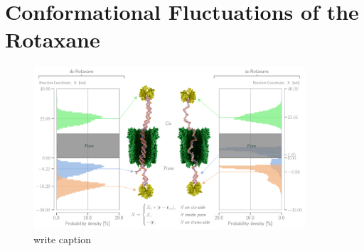 \section{Conformational Fluctuations of the Rotaxane}



\begin{figure}
\begin{center}
  \includegraphics[width=0.90\textwidth]{Figures/RotaxaneFluctuations.png}
  \caption{write caption}
\end{center}
\end{figure}
